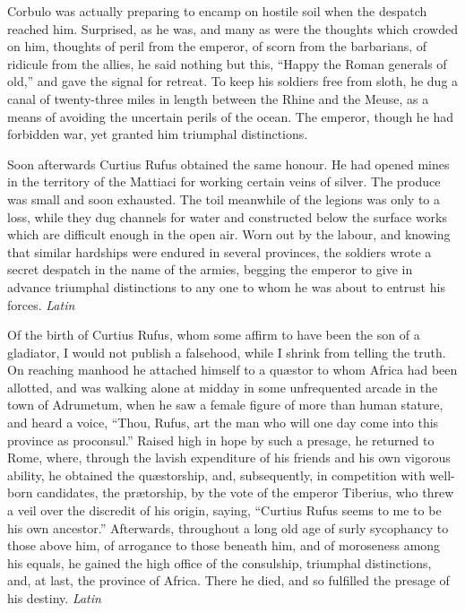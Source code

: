 
Corbulo was actually preparing to encamp on hostile soil when the despatch reached him. Surprised, as he was, and many as were the thoughts which crowded on him, thoughts of peril from the emperor, of scorn from the barbarians, of ridicule from the allies, he said nothing but this, ``Happy the Roman generals of old,'' and gave the signal for retreat. To keep his soldiers free from sloth, he dug a canal of twenty-three miles in length between the Rhine and the Meuse, as a means of avoiding the uncertain perils of the ocean. The emperor, though he had forbidden war, yet granted him triumphal distinctions.

Soon afterwards Curtius Rufus obtained the same honour. He had opened mines in the territory of the Mattiaci for working certain veins of silver. The produce was small and soon exhausted. The toil meanwhile of the legions was only to a loss, while they dug channels for water and constructed below the surface works which are difficult enough in the open air. Worn out by the labour, and knowing that similar hardships were endured in several provinces, the soldiers wrote a secret despatch in the name of the armies, begging the emperor to give in advance triumphal distinctions to any one to whom he was about to entrust his forces. \emph{Latin}


Of the birth of Curtius Rufus, whom some affirm to have been the son of a gladiator, I would not publish a falsehood, while I shrink from telling the truth. On reaching manhood he attached himself to a quæstor to whom Africa had been allotted, and was walking alone at midday in some unfrequented arcade in the town of Adrumetum, when he saw a female figure of more than human stature, and heard a voice, ``Thou, Rufus, art the man who will one day come into this province as proconsul.'' Raised high in hope by such a presage, he returned to Rome, where, through the lavish expenditure of his friends and his own vigorous ability, he obtained the quæstorship, and, subsequently, in competition with well-born candidates, the prætorship, by the vote of the emperor Tiberius, who threw a veil over the discredit of his origin, saying, ``Curtius Rufus seems to me to be his own ancestor.'' Afterwards, throughout a long old age of surly sycophancy to those above him, of arrogance to those beneath him, and of moroseness among his equals, he gained the high office of the consulship, triumphal distinctions, and, at last, the province of Africa. There he died, and so fulfilled the presage of his destiny. \emph{Latin}

